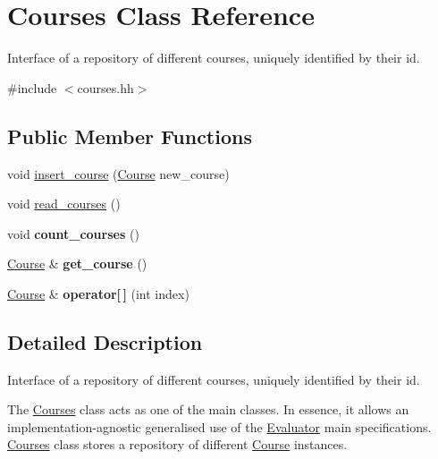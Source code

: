 \hypertarget{classCourses}{}\section{Courses Class Reference}
\label{classCourses}


Interface of a repository of different courses, uniquely identified by their id.  




{\ttfamily \#include $<$courses.\+hh$>$}

\subsection*{Public Member Functions}
\begin{DoxyCompactItemize}
\item 
void \hyperlink{classCourses_aa517f12f1ebd7bbbcbca54db4bb50fcf}{insert\+\_\+course} (\hyperlink{classCourse}{Course} new\+\_\+course)
\item 
void \hyperlink{classCourses_abe5ba34cce12ce025329979132bdcfd0}{read\+\_\+courses} ()
\item 
\mbox{\label{classCourses_a0303d552c1ca1acc8e323a786ef0c924}} 
void {\bfseries count\+\_\+courses} ()
\item 
\mbox{\label{classCourses_a211372fbef9ae6990675ec537de29152}} 
\hyperlink{classCourse}{Course} \& {\bfseries get\+\_\+course} ()
\item 
\mbox{\label{classCourses_a76e6bb2e734d35603ce9dbb2f4110688}} 
\hyperlink{classCourse}{Course} \& {\bfseries operator\mbox{[}$\,$\mbox{]}} (int index)
\end{DoxyCompactItemize}


\subsection{Detailed Description}
Interface of a repository of different courses, uniquely identified by their id. 

The \hyperlink{classCourses}{Courses} class acts as one of the main classes. In essence, it allows an implementation-\/agnostic generalised use of the \hyperlink{classEvaluator}{Evaluator} main specifications. \hyperlink{classCourses}{Courses} class stores a repository of different \hyperlink{classCourse}{Course} instances. 

